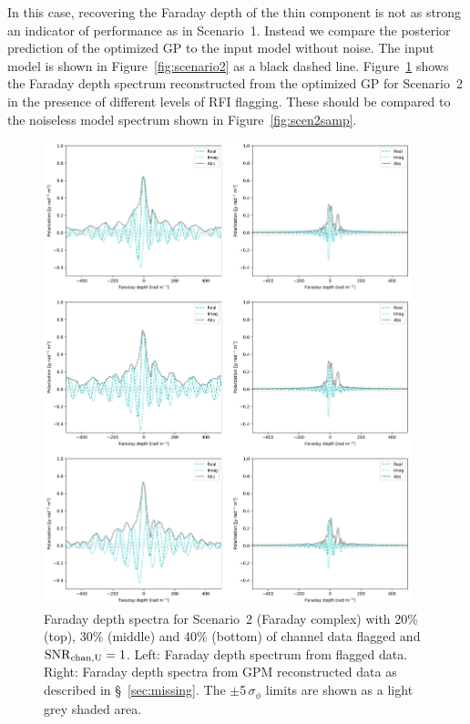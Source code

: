 \documentclass[fleqn,usenatbib]{mnras}
\begin{document}
In this case, recovering the Faraday depth of the thin component is not as strong an indicator of performance as in Scenario~1. Instead we compare the posterior prediction of the optimized GP to the input model without noise. The input model is shown in Figure~\ref{fig:scenario2} as a black dashed line. Figure~\ref{fig:flagging2} shows the Faraday depth spectrum reconstructed from the optimized GP for Scenario~2 in the presence of different levels of RFI flagging. These should be compared to the noiseless model spectrum shown in Figure~\ref{fig:scen2samp}.
%
\begin{figure}
\centerline{\includegraphics[width=0.95\textwidth]{./FIGURES/figure8.png}}
\caption{\label{fig:flagging2} Faraday depth spectra for Scenario~2 (Faraday complex) with 20\% (top), 30\% (middle) and 40\% (bottom) of channel data flagged and ${\rm SNR}_{\rm chan, U} = 1$. Left: Faraday depth spectrum from flagged data. Right: Faraday depth spectra from GPM reconstructed data as described in \S~\ref{sec:missing}. The $\pm$5\,$\sigma_{\phi}$ limits are shown as a light grey shaded area.}
\end{figure}
\end{document}
